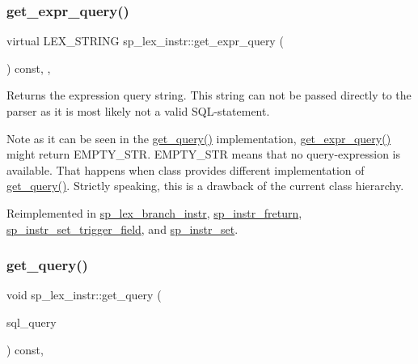 \subsubsection{\texorpdfstring{get\+\_\+expr\+\_\+query()}{get\_expr\_query()}}
{\footnotesize\ttfamily virtual L\+E\+X\+\_\+\+S\+T\+R\+I\+NG sp\+\_\+lex\+\_\+instr\+::get\+\_\+expr\+\_\+query (\begin{DoxyParamCaption}{ }\end{DoxyParamCaption}) const\hspace{0.3cm}{\ttfamily [inline]}, {\ttfamily [protected]}, {\ttfamily [virtual]}}

\begin{DoxyReturn}{Returns}
the expression query string. This string can not be passed directly to the parser as it is most likely not a valid S\+QL-\/statement.
\end{DoxyReturn}
\begin{DoxyNote}{Note}
as it can be seen in the \mbox{\hyperlink{classsp__lex__instr_a8bbcccae8739634565f8be2134171b03}{get\+\_\+query()}} implementation, \mbox{\hyperlink{classsp__lex__instr_ad355d3ed08ae1fef4811fe6838ed78e2}{get\+\_\+expr\+\_\+query()}} might return E\+M\+P\+T\+Y\+\_\+\+S\+TR. E\+M\+P\+T\+Y\+\_\+\+S\+TR means that no query-\/expression is available. That happens when class provides different implementation of \mbox{\hyperlink{classsp__lex__instr_a8bbcccae8739634565f8be2134171b03}{get\+\_\+query()}}. Strictly speaking, this is a drawback of the current class hierarchy. 
\end{DoxyNote}


Reimplemented in \mbox{\hyperlink{classsp__lex__branch__instr_a3693c3f9cc8fdf15092dcb3d4183075b}{sp\+\_\+lex\+\_\+branch\+\_\+instr}}, \mbox{\hyperlink{classsp__instr__freturn_adccc76ff6c7a1c0f72b58eda6e542e19}{sp\+\_\+instr\+\_\+freturn}}, \mbox{\hyperlink{classsp__instr__set__trigger__field_ae10dfb93c95ef7b04ae13d4d8cc9c5fc}{sp\+\_\+instr\+\_\+set\+\_\+trigger\+\_\+field}}, and \mbox{\hyperlink{classsp__instr__set_a13de9a0560941323d3cc7c9918e00036}{sp\+\_\+instr\+\_\+set}}.

\mbox{\label{classsp__lex__instr_a8bbcccae8739634565f8be2134171b03}} 
\subsubsection{\texorpdfstring{get\+\_\+query()}{get\_query()}}
{\footnotesize\ttfamily void sp\+\_\+lex\+\_\+instr\+::get\+\_\+query (\begin{DoxyParamCaption}\item[{String $\ast$}]{sql\+\_\+query }\end{DoxyParamCaption}) const\hspace{0.3cm}{\ttfamily [protected]}, {\ttfamily [virtual]}}

